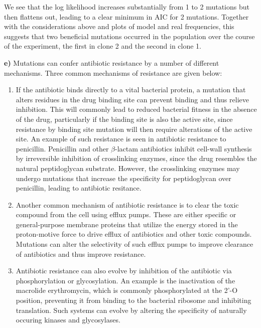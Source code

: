 \documentclass{article}
\begin{document}
We see that the log likelihood increases substantially from 1 to 2 mutations but then flattens out, leading to a clear minimum in AIC for 2 mutations. Together with the considerations above and plots of model and real frequencies, this suggests that two beneficial mutations occurred in the population over the course of the experiment, the first in clone 2 and the second in clone 1.

\textbf{e)}
Mutations can confer antibiotic resistance by a number of different mechanisms. Three common mechanisms of resistance are given below:

\begin{enumerate}
\item
If the antibiotic binds directly to a vital bacterial protein, a mutation that alters residues in the drug binding site can prevent binding and thus relieve inhibition. This will commonly lead to reduced bacterial fitness in the absence of the drug, particularly if the binding site is also the active site, since resistance by binding site mutation will then require alterations of the active site. An example of such resistance is seen in antibiotic resistance to penicillin. Penicillin and other $\beta$-lactam antibiotics inhibit cell-wall synthesis by irreversible inhibition of crosslinking enzymes, since the drug resembles the natural peptidoglycan substrate. However, the crosslinking enzymes may undergo mutations that increase the specificity for peptidoglycan over penicillin, leading to antibiotic resitance.

\item
Another common mechanism of antibiotic resistance is to clear the toxic compound from the cell using efflux pumps. These are either specific or general-purpose membrane proteins that utilize the energy stored in the proton-motive force to drive efflux of antibiotics and other toxic compounds. Mutations can alter the selectivity of such efflux pumps to improve clearance of antibiotics and thus improve resistance.

\item
Antibiotic resistance can also evolve by inhibition of the antibiotic via phosphorylation or glycosylation. An example is the inactivation of the macrolide erythromycin, which is commonly phosphorylated at the 2'-O position, preventing it from binding to the bacterial ribosome and inhibiting translation. Such systems can evolve by altering the specificity of naturally occuring kinases and glycosylases.

\end{enumerate}
\end{document}
